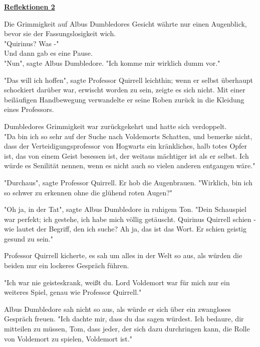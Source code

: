 

\hypertarget{reflektionen-2}{%

\textbf{\uline{Reflektionen 2}}

Die Grimmigkeit auf Albus Dumbledores Gesicht währte nur einen Augenblick, bevor sie der Fassungslosigkeit wich.\\ "Quirinus? Was -"\\ Und dann gab es eine Pause.\\ "Nun", sagte Albus Dumbledore. "Ich komme mir wirklich dumm vor."

"Das will ich hoffen", sagte Professor Quirrell leichthin; wenn er selbst überhaupt schockiert darüber war, erwischt worden zu sein, zeigte es sich nicht. Mit einer beiläufigen Handbewegung verwandelte er seine Roben zurück in die Kleidung eines Professors.

Dumbledores Grimmigkeit war zurückgekehrt und hatte sich verdoppelt.\\ "Da bin ich so sehr auf der Suche nach Voldemorts Schatten, und bemerke nicht, dass der Verteidigungsprofessor von Hogwarts ein kränkliches, halb totes Opfer ist, das von einem Geist besessen ist, der weitaus mächtiger ist als er selbst. Ich würde es Senilität nennen, wenn es nicht auch so vielen anderen entgangen wäre."

"Durchaus", sagte Professor Quirrell. Er hob die Augenbrauen. "Wirklich, bin ich so schwer zu erkennen ohne die glühend roten Augen?"

"Oh ja, in der Tat", sagte Albus Dumbledore in ruhigem Ton. "Dein Schauspiel war perfekt; ich gestehe, ich habe mich völlig getäuscht. Quirinus Quirrell schien - wie lautet der Begriff, den ich suche? Ah ja, das ist das Wort. Er schien geistig gesund zu sein."

Professor Quirrell kicherte, es sah um alles in der Welt so aus, als würden die beiden nur ein lockeres Gespräch führen.

"Ich war nie geisteskrank, weißt du. Lord Voldemort war für mich nur ein weiteres Spiel, genau wie Professor Quirrell."

Albus Dumbledore sah nicht so aus, als würde er sich über ein zwangloses Gespräch freuen. "Ich dachte mir, dass du das sagen würdest. Ich bedaure, dir mitteilen zu müssen, Tom, dass jeder, der sich dazu durchringen kann, die Rolle von Voldemort zu spielen, Voldemort ist."

}
